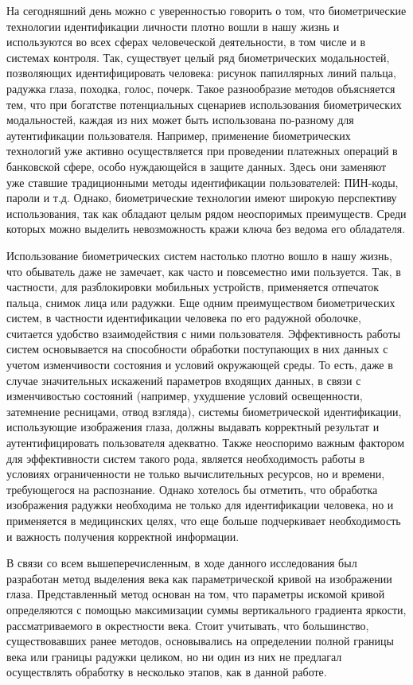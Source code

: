 \documentclass[12pt]{article} %
\begin{document}
На сегодняшний день можно с уверенностью говорить о том, что биометрические технологии идентификации личности плотно вошли в нашу жизнь и используются во всех сферах человеческой деятельности, в том числе и в системах контроля. Так, существует целый ряд биометрических модальностей, позволяющих идентифицировать человека: рисунок папиллярных линий пальца, радужка глаза, походка, голос, почерк. Такое разнообразие методов объясняется тем, что при богатстве потенциальных сценариев использования биометрических модальностей, каждая из них может быть использована по-разному для аутентификации пользователя. Например, применение биометрических технологий уже активно осуществляется при проведении платежных операций в банковской сфере, особо нуждающейся в защите данных. Здесь они заменяют уже ставшие традиционными методы идентификации пользователей: ПИН-коды, пароли и т.д. Однако, биометрические технологии имеют широкую перспективу использования, так как обладают целым рядом неоспоримых преимуществ. Среди которых можно выделить невозможность кражи ключа без ведома его обладателя.

Использование биометрических систем настолько плотно вошло в нашу жизнь, что обыватель даже не замечает, как часто и повсеместно ими пользуется. Так, в частности, для разблокировки мобильных устройств, применяется отпечаток пальца, снимок лица или радужки. Еще одним преимуществом биометрических систем, в частности идентификации человека по его радужной оболочке, считается удобство взаимодействия с ними пользователя. Эффективность работы систем основывается на способности обработки поступающих в них данных с учетом изменчивости состояния и условий окружающей среды. То есть, даже в случае значительных искажений параметров входящих данных, в связи с изменчивостью состояний (например, ухудшение условий освещенности, затемнение ресницами, отвод взгляда), системы биометрической идентификации, использующие изображения глаза, должны выдавать корректный результат и аутентифицировать пользователя адекватно. Также неоспоримо важным фактором для эффективности систем такого рода, является необходимость работы в условиях ограниченности не только вычислительных ресурсов, но и времени, требующегося на распознание.
Однако хотелось бы отметить, что обработка изображения радужки необходима не только для идентификации человека, но и применяется в медицинских целях, что еще больше подчеркивает необходимость и важность получения корректной информации. 

\newpage
В связи со всем вышеперечисленным, в ходе данного исследования был разработан метод выделения века как параметрической кривой на изображении глаза. Представленный метод основан на том, что параметры искомой кривой определяются с помощью максимизации суммы вертикального градиента яркости, рассматриваемого в окрестности века. Стоит учитывать, что большинство, существовавших ранее методов, основывались на определении полной границы века или границы радужки целиком, но ни один из них не предлагал осуществлять обработку в несколько этапов, как в данной работе.
 
\end{document}
